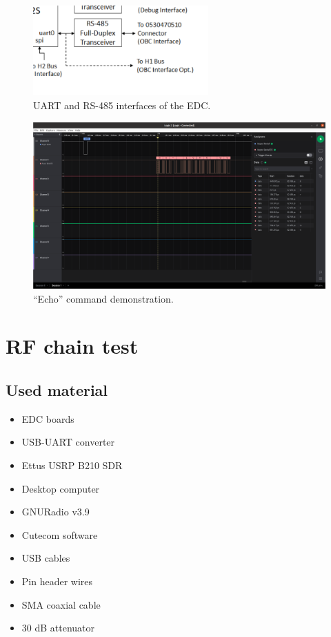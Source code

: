 \begin{figure}[!ht]
    \begin{center}
        \includegraphics[width=0.6\textwidth]{figures/edc_report/edc-bd-uart-if}
        \caption{UART and RS-485 interfaces of the EDC.}
        \label{fig:edc-bd-uart-if}
    \end{center}
\end{figure}

\begin{figure}[!ht]
    \begin{center}
        \includegraphics[width=\textwidth]{figures/edc_report/echo-cmd}
        \caption{``Echo'' command demonstration.}
        \label{fig:edc-echo-cmd}
    \end{center}
\end{figure}

\section{RF chain test}

\subsection{Used material}

\begin{itemize}
    \item EDC boards
    \item USB-UART converter
    \item Ettus USRP B210 SDR
    \item Desktop computer
    \item GNURadio v3.9
    \item Cutecom software
    \item USB cables
    \item Pin header wires
    \item SMA coaxial cable
    \item 30 dB attenuator
\end{itemize}

